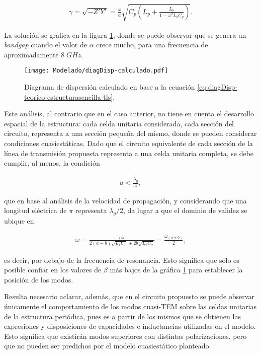\begin{align}
	\label{eq:diagDisp-teorico-estructurasencilla-tls}
	\gamma = \sqrt{-Z'Y'} = \frac{\omega}{a} \sqrt{C_p \left( L_p + \frac{L_b}{1-\omega^2 L_b C_g}\right)}.
\end{align}

La solución se grafica en la figura \ref{fig:diagDisp-calculado-celdafacil}, donde se puede observar que se genera un \textit{bandgap} cuando el valor de $\alpha$ crece mucho, para una frecuencia de aproximadamente $8\;GHz$.

\begin{figure}[h]
	\centering
	\texttt{[image: Modelado/diagDisp-calculado.pdf]}
	\caption{Diagrama de dispersión calculado en base a la ecuación \ref{eq:diagDisp-teorico-estructurasencilla-tls}.}
	\label{fig:diagDisp-calculado-celdafacil}
\end{figure}

Este análisis, al contrario que en el caso anterior, no tiene en cuenta el desarrollo espacial de la estructura: cada celda unitaria considerada, cada sección del circuito, representa a una sección pequeña del mismo, donde se pueden considerar condiciones cuasiestáticas. Dado que el circuito equivalente de cada sección de la línea de transmisión propuesta representa a una celda unitaria completa, se debe cumplir, al menos, la condición \cite{Caloz:ElectromagneticMetamaterials}

\begin{align}
	a < \frac{\lambda_g}{4},
\end{align}

que en base al análisis de la velocidad de propagación, y considerando que una longitud eléctrica de $\pi$ representa $\lambda_g / 2$, da lugar a que el dominio de validez se ubique en

\begin{align}
	\omega = \frac{n\pi}{2 (a-b) \sqrt{L_1 C_1} + 2 b \sqrt{L_2 C_2}} = \frac{\omega_{(\alpha\neq 0)}}{2},
\end{align}

es decir, por debajo de la frecuencia de resonancia. Esto significa que sólo es posible confiar en los valores de $\beta$ más bajos de la gráfica \ref{fig:diagDisp-calculado-celdafacil} para establecer la posición de los modos.

Resulta necesario aclarar, además, que en el circuito propuesto se puede observar únicamente el comportamiento de los modos cuasi-TEM sobre las celdas unitarias de la estructura periódica, pues es a partir de los mismos que se obtienen las expresiones y disposiciones de capacidades e inductancias utilizadas en el modelo. Esto significa que existirán modos superiores con distintas polarizaciones, pero que no pueden ser predichos por el modelo cuasiestático planteado.


